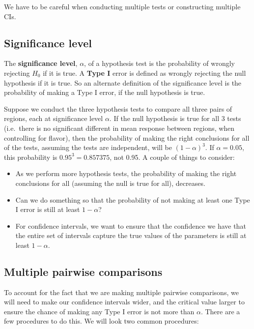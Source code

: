 \documentclass[
]{book}
\providecommand{\tightlist}{%
  \setlength{\itemsep}{0pt}\setlength{\parskip}{0pt}}
\begin{document}
We have to be careful when conducting multiple tests or constructing multiple CIs.

\hypertarget{significance-level}{%
\subsection{Significance level}\label{significance-level}}

The \textbf{significance level}, \(\alpha\), of a hypothesis test is the probability of wrongly rejecting \(H_0\) if it is true. A \textbf{Type I} error is defined as wrongly rejecting the null hypothesis if it is true. So an alternate definition of the significance level is the probability of making a Type I error, if the null hypothesis is true.

Suppose we conduct the three hypothesis tests to compare all three pairs of regions, each at significance level \(\alpha\). If the null hypothesis is true for all 3 tests (i.e.~there is no significant different in mean response between regions, when controlling for flavor), then the probability of making the right conclusions for all of the tests, assuming the tests are independent, will be \((1-\alpha)^3\). If \(\alpha=0.05\), this probability is \(0.95^3 = 0.857375\), not 0.95. A couple of things to consider:

\begin{itemize}
\tightlist
\item
  As we perform more hypothesis tests, the probability of making the right conclusions for all (assuming the null is true for all), decreases.
\item
  Can we do something so that the probability of not making at least one Type I error is still at least \(1-\alpha\)?
\item
  For confidence intervals, we want to ensure that the confidence we have that the entire set of intervals capture the true values of the parameters is still at least \(1-\alpha\).
\end{itemize}

\hypertarget{multiple-pairwise-comparisons}{%
\subsection{Multiple pairwise comparisons}\label{multiple-pairwise-comparisons}}

To account for the fact that we are making multiple pairwise comparisons, we will need to make our confidence intervals wider, and the critical value larger to ensure the chance of making any Type I error is not more than \(\alpha\). There are a few procedures to do this. We will look two common procedures:
\end{document}

